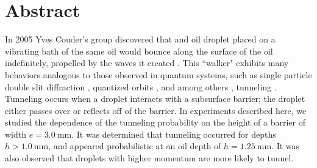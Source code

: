     \chapter*{Abstract}
	In 2005 Yves Couder's group discovered that and oil droplet placed on a vibrating bath of the same oil would bounce along the surface of the oil indefinitely, propelled by the waves it created . This ``walker" exhibits many behaviors analogous to those observed in quantum systems, such as single particle double slit diffraction , quantized orbits , and among others , tunneling . Tunneling occurs when a droplet interacts with a subsurface barrier; the droplet either passes over or reflects off of the barrier. In experiments described here, we studied the dependence of the tunneling probability on the height of a barrier of width $e=3.0~\mathrm{mm}$. It was determined that tunneling occurred for depths $h>1.0~\mathrm{mm}$, and appeared probabilistic at an oil depth of $h=1.25~\mathrm{mm}$. It was also observed that droplets with higher momentum are more likely to tunnel. 